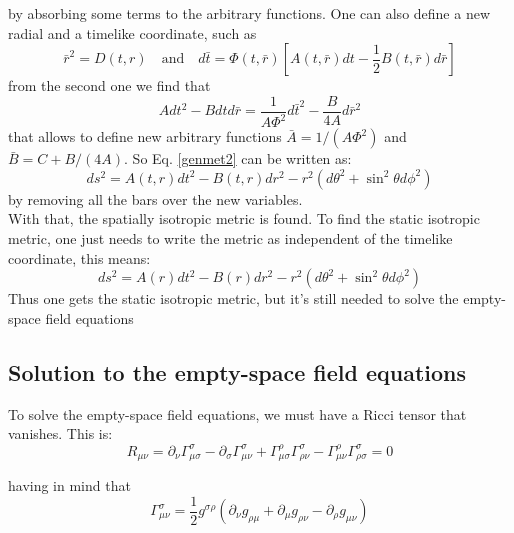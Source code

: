 \documentclass[letterpaper,11pt,onecolumn]{article}
\begin{document}
by absorbing some terms to the arbitrary functions. One can also define a new radial and a timelike coordinate, such as 
\begin{equation}
\bar{r}^{2}=D(t, r) \quad \text{and} \quad d \bar{t}=\Phi(t, \bar{r})\left[A(t, \bar{r}) d t-\frac{1}{2} B(t, \bar{r}) d \bar{r}\right]\nonumber
\end{equation}
from the second one we find that 
\begin{equation}
A d t^{2}-B d t d \bar{r}=\frac{1}{A \Phi^{2}} d \bar{t}^{2}-\frac{B}{4 A} d \bar{r}^{2} \nonumber
\end{equation}
that allows to define new arbitrary functions $\bar{A}=1 /\left(A \Phi^{2}\right)$ and $\bar{B}=C+B /(4 A)$. So Eq. \ref{genmet2} can be written as:
\begin{equation}
d s^{2}=A(t, r) d t^{2}-B(t, r) d r^{2}-r^{2}\left(d \theta^{2}+\sin ^{2} \theta d \phi^{2}\right)\nonumber
\end{equation}
by removing all the bars over the new variables.\\
With that, the spatially isotropic metric is found. To find the static isotropic metric, one just needs to write the metric as independent of the timelike coordinate, this means: 
\begin{equation}
d s^{2}=A( r) d t^{2}-B( r) d r^{2}-r^{2}\left(d \theta^{2}+\sin ^{2} \theta d \phi^{2}\right)\nonumber
\end{equation}
Thus one gets the static isotropic metric, but it's still needed to solve the empty-space field equations
\subsection{Solution to the empty-space field equations}
To solve the empty-space field equations, we must have a Ricci tensor that vanishes. This is:
\begin{equation}
        R_{\mu \nu}=\partial_{\nu} \Gamma_{\mu \sigma}^{\sigma}-\partial_{\sigma} \Gamma_{\mu \nu}^{\sigma}+\Gamma_{\mu \sigma}^{\rho} \Gamma_{\rho \nu}^{\sigma}-\Gamma_{\mu \nu}^{\rho} \Gamma_{\rho \sigma}^{\sigma}=0
        \label{ricci}
\end{equation}

having in mind that
\begin{equation}
\Gamma_{\mu \nu}^{\sigma}=\frac{1}{2} g^{\sigma \rho}\left(\partial_{\nu} g_{\rho \mu}+\partial_{\mu} g_{\rho \nu}-\partial_{\rho} g_{\mu \nu}\right)
\label{conn}
\end{equation}
\end{document}
